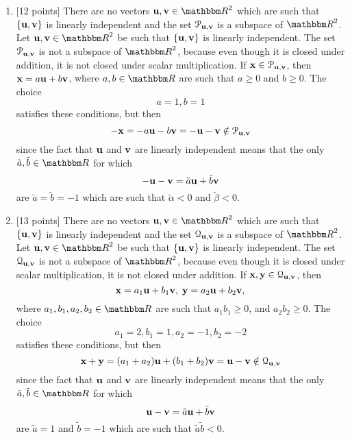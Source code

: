 \begin{solution}
\begin{enumerate}
\item {[12 points]} There are no vectors $\Bu,\Bv\in\R^2$ which are such that $\{{\bf u},{\bf v}\}$ is linearly independent and the set $\EuScript{P}_{{\bf u},{\bf v}}$ is a subspace of $\R^2$. Let $\Bu,\Bv\in\R^2$ be such that $\{{\bf u},{\bf v}\}$ is linearly independent. The set $\EuScript{P}_{{\bf u},{\bf v}}$ is not a subspace of $\R^2$, because even though it is closed under addition, it is not closed under scalar multiplication. If ${\bf x}\in\EuScript{P}_{{\bf u},{\bf v}}$, then ${\bf x}=a{\bf u}+b{\bf v}$, where $a,b\in\R$ are such that $a\ge0$ and $b\ge0$. The choice
\[
a=1,b=1
\]
satisfies these conditions, but then
\[
-{\bf x}=-a{\bf u}-b{\bf v}=-{\bf u}-{\bf v}\notin\EuScript{P}_{{\bf u},{\bf v}}
\]
since the fact that ${\bf u}$ and ${\bf v}$ are linearly independent means that the only $\tilde{a},\tilde{b}\in\R$ for which
\[
-{\bf u}-{\bf v}=\tilde{a}{\bf u}+\tilde{b}{\bf v}
\]
are $\tilde{a}=\tilde{b}=-1$ which are such that $\tilde{\alpha}<0$ and $\tilde{\beta}<0$.

\item {[13 points]} There are no vectors $\Bu,\Bv\in\R^2$ which are such that $\{{\bf u},{\bf v}\}$ is linearly independent and the set $\EuScript{Q}_{{\bf u},{\bf v}}$ is a subspace of $\R^2$. Let $\Bu,\Bv\in\R^2$ be such that $\{{\bf u},{\bf v}\}$ is linearly independent. The set $\EuScript{Q}_{{\bf u},{\bf v}}$ is not a subspace of $\R^2$, because even though it is closed under scalar multiplication, it is not closed under addition. If ${\bf x},{\bf y}\in\EuScript{Q}_{{\bf u},{\bf v}}$, then 
\[
{\bf x}=a_1{\bf u}+b_1{\bf v},\; {\bf y}=a_2{\bf u}+b_2{\bf v},
\]
where $a_1,b_1,a_2,b_2\in\R$ are such that $a_1b_1\ge0$, and $a_2b_2\ge0$. The choice
\[
a_1=2,b_1=1,a_2=-1,b_2=-2
\]
satisfies these conditions, but then
\[
{\bf x}+{\bf y}=(a_1+a_2){\bf u}+(b_1+b_2){\bf v}={\bf u}-{\bf v}\notin\EuScript{Q}_{{\bf u},{\bf v}}
\]
since the fact that ${\bf u}$ and ${\bf v}$ are linearly independent means that the only $\tilde{a},\tilde{b}\in\R$ for which
\[
{\bf u}-{\bf v}=\tilde{a}{\bf u}+\tilde{b}{\bf v}
\]
are $\tilde{a}=1$ and $\tilde{b}=-1$ which are such that $\tilde{a}\tilde{b}<0$.




\end{enumerate}
\end{solution}
